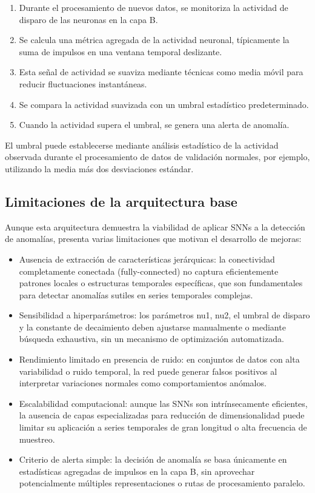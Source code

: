 \begin{enumerate}
    \item Durante el procesamiento de nuevos datos, se monitoriza la actividad de disparo de las neuronas en la capa B.
    \item Se calcula una métrica agregada de la actividad neuronal, típicamente la suma de impulsos en una ventana temporal deslizante.
    \item Esta señal de actividad se suaviza mediante técnicas como media móvil para reducir fluctuaciones instantáneas.
    \item Se compara la actividad suavizada con un umbral estadístico predeterminado.
    \item Cuando la actividad supera el umbral, se genera una alerta de anomalía.
\end{enumerate}

El umbral puede establecerse mediante análisis estadístico de la actividad observada durante el procesamiento de datos de validación normales, por ejemplo, utilizando la media más dos desviaciones estándar.

\subsection{Limitaciones de la arquitectura base}

Aunque esta arquitectura demuestra la viabilidad de aplicar SNNs a la detección de anomalías, presenta varias limitaciones que motivan el desarrollo de mejoras:

\begin{itemize}
    \item Ausencia de extracción de características jerárquicas: la conectividad completamente conectada (fully-connected) no captura eficientemente patrones locales o estructuras temporales específicas, que son fundamentales para detectar anomalías sutiles en series temporales complejas.
    
    \item Sensibilidad a hiperparámetros: los parámetros nu1, nu2, el umbral de disparo y la constante de decaimiento deben ajustarse manualmente o mediante búsqueda exhaustiva, sin un mecanismo de optimización automatizada.
    
    \item Rendimiento limitado en presencia de ruido: en conjuntos de datos con alta variabilidad o ruido temporal, la red puede generar falsos positivos al interpretar variaciones normales como comportamientos anómalos.
    
    \item Escalabilidad computacional: aunque las SNNs son intrínsecamente eficientes, la ausencia de capas especializadas para reducción de dimensionalidad puede limitar su aplicación a series temporales de gran longitud o alta frecuencia de muestreo.
    
    \item Criterio de alerta simple: la decisión de anomalía se basa únicamente en estadísticas agregadas de impulsos en la capa B, sin aprovechar potencialmente múltiples representaciones o rutas de procesamiento paralelo.
\end{itemize}

